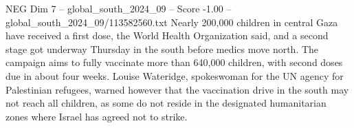 \begin{textsample}{NEG Dim 7 – global\_south\_2024\_09 – Score -1.00 – global\_south\_2024\_09/113582560.txt}
Nearly 200,000 children in central Gaza have received a first dose, the World Health Organization said, and a second stage got underway Thursday in the south before medics move north.
The campaign aims to fully vaccinate more than 640,000 children, with second doses due in about four weeks.
Louise Wateridge, spokeswoman for the UN agency for Palestinian refugees, warned however that the vaccination drive in the south may not reach all children, as some do not reside in the designated humanitarian zones where Israel has agreed not to strike.

\end{textsample}
